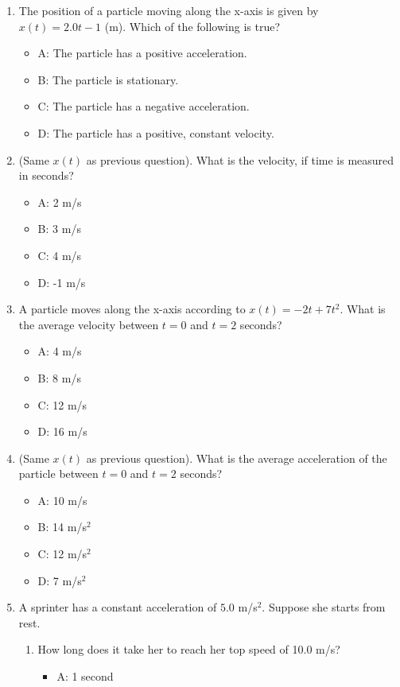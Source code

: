 \documentclass[10pt]{article}
\begin{document}
\begin{enumerate}

\item The position of a particle moving along the x-axis is given by $x(t) = 2.0t-1$ (m).  Which of the following is true?
\begin{itemize}
\item A: The particle has a positive acceleration.
\item B: The particle is stationary.
\item C: The particle has a negative acceleration.
\item D: The particle has a positive, constant velocity.
\end{itemize}
\item (Same $x(t)$ as previous question).  What is the velocity, if time is measured in seconds?
\begin{itemize}
\item A: 2 m/s
\item B: 3 m/s
\item C: 4 m/s
\item D: -1 m/s
\end{itemize}
\item A particle moves along the x-axis according to $x(t) = -2t + 7t^2$.  What is the average velocity between $t=0$ and $t=2$ seconds?
\begin{itemize}
\item A: 4 m/s
\item B: 8 m/s
\item C: 12 m/s
\item D: 16 m/s
\end{itemize}
\item (Same $x(t)$ as previous question).  What is the average acceleration of the particle between $t=0$ and $t=2$ seconds?
\begin{itemize}
\item A: 10 m/s
\item B: 14 m/s$^2$
\item C: 12 m/s$^2$
\item D: 7 m/s$^2$
\end{itemize}
\item A sprinter has a constant acceleration of $5.0$ m/s$^2$.  Suppose she starts from rest.  
\begin{enumerate}
\item How long does it take her to reach her top speed of 10.0 m/s?
\begin{itemize}
\item A: 1 second

\end{itemize}
\end{enumerate}
\end{enumerate}
\end{document}
